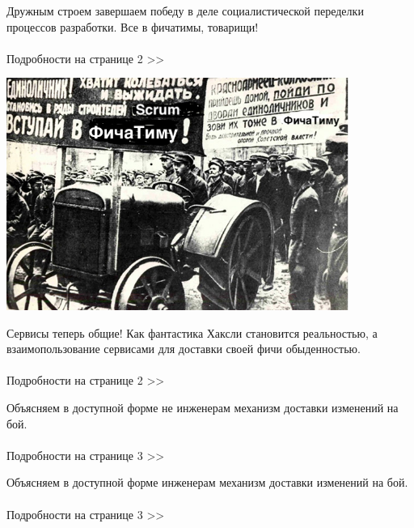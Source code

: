 \documentclass{article}
\date{\today}
\begin{document}
\maketitle

\begin{multicols}{3}

Дружным строем завершаем победу в деле социалистической переделки процессов разработки. Все в фичатимы, товарищи!
\\\\Подробности на странице 2 >>
\vspace{14mm}
\closearticle

\includegraphics[width=11.2cm]{klh2.jpeg}

\end{multicols}

\begin{multicols}{3}

Сервисы теперь общие! Как фантастика Хаксли становится реальностью, а взаимопользование сервисами для доставки своей фичи обыденностью.
\\\\Подробности на странице 2 >>
\closearticle

Объясняем в доступной форме не инженерам механизм доставки изменений на бой.
\\\\Подробности на странице 3 >>
\vspace{5mm}
\closearticle

Объясняем в доступной форме инженерам механизм доставки изменений на бой.
\\\\Подробности на странице 3 >>
\closearticle

\end{multicols}
\end{document}
